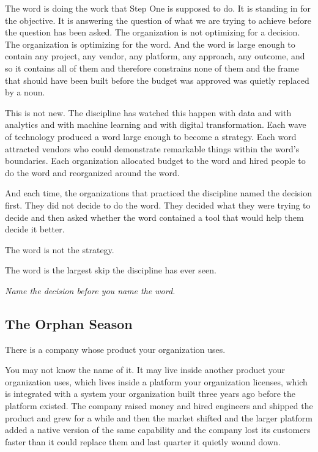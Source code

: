 The word is doing the work that Step One is supposed to do. It is standing in for the objective. It is answering the question of what we are trying to achieve before the question has been asked. The organization is not optimizing for a decision. The organization is optimizing for the word. And the word is large enough to contain any project, any vendor, any platform, any approach, any outcome, and so it contains all of them and therefore constrains none of them and the frame that should have been built before the budget was approved was quietly replaced by a noun.

This is not new. The discipline has watched this happen with data and with analytics and with machine learning and with digital transformation. Each wave of technology produced a word large enough to become a strategy. Each word attracted vendors who could demonstrate remarkable things within the word's boundaries. Each organization allocated budget to the word and hired people to do the word and reorganized around the word.

And each time, the organizations that practiced the discipline named the decision first. They did not decide to do the word. They decided what they were trying to decide and then asked whether the word contained a tool that would help them decide it better.

The word is not the strategy.

The word is the largest skip the discipline has ever seen.

\textit{Name the decision before you name the word.}

\subsection*{The Orphan Season}

There is a company whose product your organization uses.

You may not know the name of it. It may live inside another product your organization uses, which lives inside a platform your organization licenses, which is integrated with a system your organization built three years ago before the platform existed. The company raised money and hired engineers and shipped the product and grew for a while and then the market shifted and the larger platform added a native version of the same capability and the company lost its customers faster than it could replace them and last quarter it quietly wound down.

